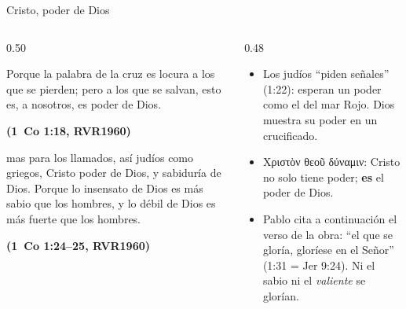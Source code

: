 \documentclass[hyperref={bookmarks=false},aspectratio=169]{beamer}
\newcommand{\grc}[1]{\foreignlanguage{ancientgreek}{#1}}
\newcommand{\fuente}[1]{\par\hfill{\upshape\bfseries\footnotesize\textcolor{azul}{#1}}}
\newcommand{\destacar}[1]{\textbf{\textcolor{azul}{#1}}}
\begin{document}
\begin{frame}{Cristo, poder de Dios}
\begin{columns}[t,onlytextwidth]
\begin{column}{0.50\textwidth}
\begin{cita}Porque la palabra de la cruz es locura a los que se pierden; pero a los que se salvan, esto es, a nosotros, es poder de Dios.\fuente{(1~Co 1:18, RVR1960)}\end{cita}
\begin{cita}mas para los llamados, así judíos como griegos, Cristo poder de Dios, y sabiduría de Dios. Porque lo insensato de Dios es más sabio que los hombres, y lo débil de Dios es más fuerte que los hombres.\fuente{(1~Co 1:24--25, RVR1960)}\end{cita}
\end{column}
\begin{column}{0.48\textwidth}\small
\begin{itemize}
\item Los judíos ``piden señales'' (1:22): esperan un poder como el del mar Rojo. Dios muestra su poder en un crucificado.
\item \grc{Χριστὸν θεοῦ δύναμιν}: Cristo no solo tiene poder; \destacar{es} el poder de Dios.
\item Pablo cita a continuación el verso de la obra: ``el que se gloría, gloríese en el Señor'' (1:31 = Jer 9:24). Ni el sabio ni el \emph{valiente} se glorían.
\end{itemize}
\end{column}
\end{columns}
\end{frame}
\end{document}
